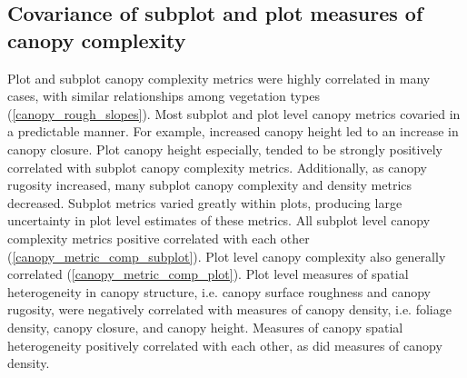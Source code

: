 \documentclass[11pt,a4paper]{article}
\begin{document}
\subsection{Covariance of subplot and plot measures of canopy complexity}

Plot and subplot canopy complexity metrics were highly correlated in many cases, with similar relationships among vegetation types (\autoref{canopy_rough_slopes}). Most subplot and plot level canopy metrics covaried in a predictable manner. For example, increased canopy height led to an increase in canopy closure. Plot canopy height especially, tended to be strongly positively correlated with subplot canopy complexity metrics. Additionally, as canopy rugosity increased, many subplot canopy complexity and density metrics decreased. Subplot metrics varied greatly within plots, producing large uncertainty in plot level estimates of these metrics. All subplot level canopy complexity metrics positive correlated with each other (\autoref{canopy_metric_comp_subplot}). Plot level canopy complexity also generally correlated (\autoref{canopy_metric_comp_plot}). Plot level measures of spatial heterogeneity in canopy structure, i.e. canopy surface roughness and canopy rugosity, were negatively correlated with measures of canopy density, i.e. foliage density, canopy closure, and canopy height. Measures of canopy spatial heterogeneity positively correlated with each other, as did measures of canopy density.
\end{document}
